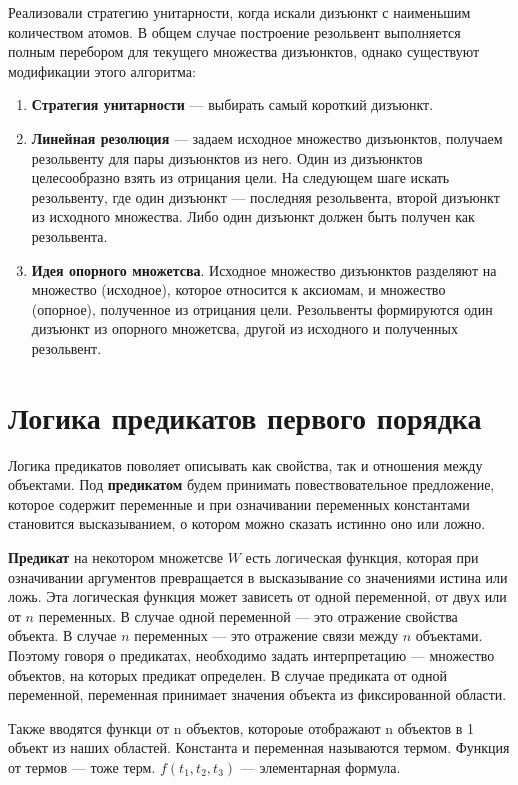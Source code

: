 Реализовали стратегию унитарности, когда искали дизъюнкт с наименьшим количеством атомов. В общем случае построение резольвент выполняется полным перебором для текущего множества дизъюнктов, однако существуют модификации этого алгоритма:

\begin{enumerate}
    \item \textbf{Стратегия унитарности} --- выбирать самый короткий дизъюнкт.
    \item \textbf{Линейная резолюция} --- задаем исходное множество дизъюнктов, получаем резольвенту для пары дизъюнктов из него. Один из дизъюнктов целесообразно взять из отрицания цели. На следующем шаге искать резольвенту, где один дизъюнкт --- последняя резольвента, второй дизъюнкт из исходного множества. Либо один дизъюнкт должен быть получен как резольвента.
    \item \textbf{Идея опорного множетсва}. Исходное множество дизъюнктов разделяют на множество (исходное), которое относится к аксиомам, и множество (опорное), полученное из отрицания цели. Резольвенты формируются один дизъюнкт из опорного множетсва, другой из исходного и полученных резольвент.
\end{enumerate}

\section{Логика предикатов первого порядка}

Логика предикатов поволяет описывать как свойства, так и отношения между объектами.
Под \textbf{предикатом} будем принимать повествовательное предложение, которое содержит переменные и при означивании переменных константами становится высказыванием, о котором можно сказать истинно оно или ложно.

\textbf{Предикат} на некотором множетсве $W$ есть логическая функция, которая при означивании аргументов превращается в высказывание со значениями истина или ложь. Эта логическая функция может зависеть от одной переменной, от двух или от $n$ переменных. В случае одной переменной --- это отражение свойства объекта. В случае $n$ переменных --- это отражение связи между $n$ объектами. Поэтому говоря о предикатах, необходимо задать интерпретацию --- множество объектов, на которых предикат определен. В случае предиката от одной переменной, переменная принимает значения объекта из фиксированной области.

Также вводятся функци от n объектов, котороые отображают n объектов в 1 объект из наших областей. Константа и переменная называются термом. Функция от термов --- тоже терм. $f(t_1, t_2, t_3)$ --- элементарная формула.

